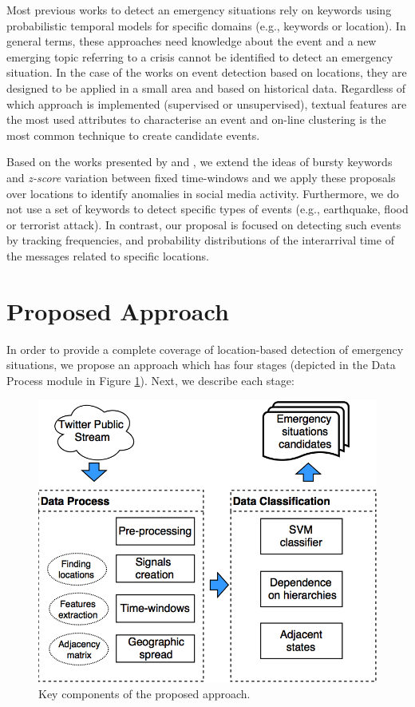\documentclass[sigconf]{acmart}
\begin{document}
\medskip

 Most previous works to detect an emergency situations rely on keywords using probabilistic temporal models for specific domains (e.g., keywords or location). In general terms, these approaches need knowledge about the event and a new emerging topic referring to a crisis cannot be identified to detect an emergency situation. In the case of the works on event detection based on locations, they are designed to be applied in a small area and based on historical data. Regardless of which approach is implemented (supervised or unsupervised), textual features are the most used attributes to characterise an event and on-line clustering is the most common technique to create candidate events.

Based on the works presented by \citeauthor{guzman2013line} \cite{guzman2013line} and \citeauthor{maldonado2017} \cite{maldonado2017}, we extend the ideas of bursty keywords and \textit{z-score} variation between fixed time-windows and we apply these proposals over locations to identify anomalies in social media activity. Furthermore, we do not use a set of keywords to detect specific types of events (e.g., earthquake, flood or terrorist attack). In contrast, our proposal is focused on detecting such events by tracking frequencies, and probability distributions of the interarrival time of the messages related to specific locations.



\section{Proposed Approach}

In order to provide a complete coverage of location-based detection of emergency situations, we propose an approach which has four stages (depicted in the Data Process module in Figure \ref{fig:diagram}). Next, we describe each stage:

\begin{figure}
	\centering
	\includegraphics[width=\columnwidth]{img/diagram2.png}
	\caption{Key components of the proposed approach.}
	\label{fig:diagram}
\end{figure}
\end{document}
